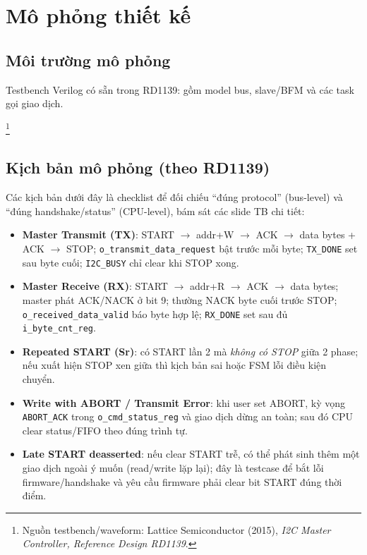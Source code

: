 \section{Mô phỏng thiết kế}

\subsection{Môi trường mô phỏng}
Testbench Verilog có sẵn trong RD1139: gồm model bus, slave/BFM và các task gọi giao dịch.

\footnote{Nguồn testbench/waveform: Lattice Semiconductor (2015), \emph{I2C Master Controller, Reference Design RD1139}.}

\subsection{Kịch bản mô phỏng (theo RD1139)}
Các kịch bản dưới đây là checklist để đối chiếu ``đúng protocol'' (bus-level) và ``đúng handshake/status'' (CPU-level), bám sát các slide TB chi tiết:
\begin{itemize}[leftmargin=1.2cm]
    \item \textbf{Master Transmit (TX)}: START $\rightarrow$ addr+W $\rightarrow$ ACK $\rightarrow$ data bytes + ACK $\rightarrow$ STOP; \texttt{o\_transmit\_data\_request} bật trước mỗi byte; \texttt{TX\_DONE} set sau byte cuối; \texttt{I2C\_BUSY} chỉ clear khi STOP xong.
    \item \textbf{Master Receive (RX)}: START $\rightarrow$ addr+R $\rightarrow$ ACK $\rightarrow$ data bytes; master phát ACK/NACK ở bit 9; thường NACK byte cuối trước STOP; \texttt{o\_received\_data\_valid} báo byte hợp lệ; \texttt{RX\_DONE} set sau đủ \texttt{i\_byte\_cnt\_reg}.
    \item \textbf{Repeated START (Sr)}: có START lần 2 mà \emph{không có STOP} giữa 2 phase; nếu xuất hiện STOP xen giữa thì kịch bản sai hoặc FSM lỗi điều kiện chuyển.
    \item \textbf{Write with ABORT / Transmit Error}: khi user set ABORT, kỳ vọng \texttt{ABORT\_ACK} trong \texttt{o\_cmd\_status\_reg} và giao dịch dừng an toàn; sau đó CPU clear status/FIFO theo đúng trình tự.
    \item \textbf{Late START deasserted}: nếu clear START trễ, có thể phát sinh thêm một giao dịch ngoài ý muốn (read/write lặp lại); đây là testcase để bắt lỗi firmware/handshake và yêu cầu firmware phải clear bit START đúng thời điểm.
\end{itemize}

